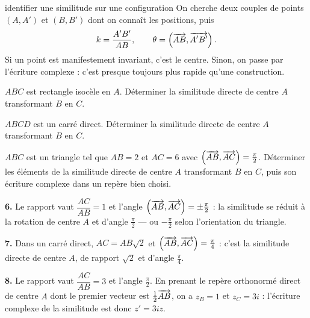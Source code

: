 \begin{methode}{identifier une similitude sur une configuration}
On cherche deux couples de points $(A,A')$ et $(B,B')$ dont on connaît les
positions, puis
\[
  k = \frac{A'B'}{AB},
  \qquad
  \theta = \left(\overrightarrow{AB},\overrightarrow{A'B'}\right).
\]
Si un point est manifestement invariant, c'est le centre. Sinon, on passe par
l'écriture complexe : c'est presque toujours plus rapide qu'une construction.
\end{methode}

\begin{entrainement}[configurations]
\exo[\niveau{2}] $ABC$ est rectangle isocèle en $A$. Déterminer la similitude
directe de centre $A$ transformant $B$ en $C$.

\exo[\niveau{2}] $ABCD$ est un carré direct. Déterminer la similitude directe
de centre $A$ transformant $B$ en $C$.

\exo[\niveau{3}] $ABC$ est un triangle tel que $AB = 2$ et $AC = 6$ avec
$\left(\overrightarrow{AB},\overrightarrow{AC}\right) = \frac{\pi}{2}$. Déterminer les éléments de
la similitude directe de centre $A$ transformant $B$ en $C$, puis son écriture
complexe dans un repère bien choisi.
\end{entrainement}

\begin{corrige}
\textbf{6.} Le rapport vaut $\dfrac{AC}{AB} = 1$ et l'angle
$\left(\overrightarrow{AB},\overrightarrow{AC}\right) = \pm\frac{\pi}{2}$ : la similitude se
réduit à la rotation de centre $A$ et d'angle $\frac{\pi}{2}$ — ou
$-\frac{\pi}{2}$ selon l'orientation du triangle.

\textbf{7.} Dans un carré direct, $AC = AB\sqrt2$ et
$\left(\overrightarrow{AB},\overrightarrow{AC}\right) = \frac{\pi}{4}$ : c'est la similitude
directe de centre $A$, de rapport $\sqrt2$ et d'angle $\frac{\pi}{4}$.

\textbf{8.} Le rapport vaut $\dfrac{AC}{AB} = 3$ et l'angle $\frac{\pi}{2}$.
En prenant le repère orthonormé direct de centre $A$ dont le premier vecteur
est $\frac12\overrightarrow{AB}$, on a $z_{B} = 1$ et $z_{C} = 3i$ : l'écriture complexe
de la similitude est donc $z' = 3iz$.
\end{corrige}

